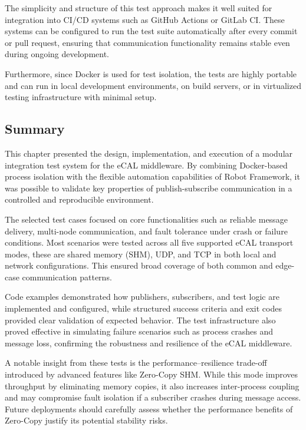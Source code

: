 \vspace{0.5em}
The simplicity and structure of this test approach makes it well suited for integration into CI/CD systems such as GitHub Actions or GitLab CI. These systems can be configured to run the test suite automatically after every commit or pull request, ensuring that communication functionality remains stable even during ongoing development.

\vspace{0.9em}
Furthermore, since Docker is used for test isolation, the tests are highly portable and can run in local development environments, on build servers, or in virtualized testing infrastructure with minimal setup.

\newpage
\subsection{Summary}

This chapter presented the design, implementation, and execution of a modular integration test system for the eCAL middleware. By combining Docker-based process isolation with the flexible automation capabilities of Robot Framework, it was possible to validate key properties of publish-subscribe communication in a controlled and reproducible environment.

\vspace{1em}
The selected test cases focused on core functionalities such as reliable message delivery, multi-node communication, and fault tolerance under crash or failure conditions. Most scenarios were tested across all five supported eCAL transport modes, these are shared memory (SHM), UDP, and TCP in both local and network configurations. This ensured broad coverage of both common and edge-case communication patterns.

\vspace{1em}
Code examples demonstrated how publishers, subscribers, and test logic are implemented and configured, while structured success criteria and exit codes provided clear validation of expected behavior. The test infrastructure also proved effective in simulating failure scenarios such as process crashes and message loss, confirming the robustness and resilience of the eCAL middleware.

\vspace{1em}
A notable insight from these tests is the performance–resilience trade-off introduced by advanced features like Zero-Copy SHM. While this mode improves throughput by eliminating memory copies, it also increases inter-process coupling and may compromise fault isolation if a subscriber crashes during message access. Future deployments should carefully assess whether the performance benefits of Zero-Copy justify its potential stability risks.

